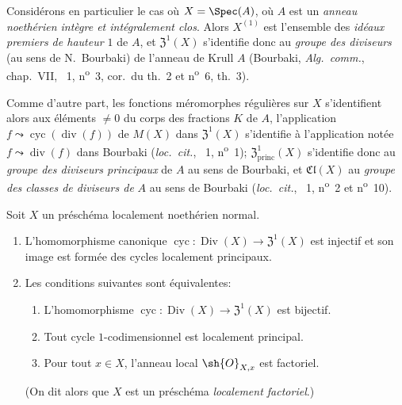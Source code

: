 \begin{env}[21.6.8]
\label{IV.21.6.8}
Considérons en particulier le cas où $X=\Spec(A)$, où $A$ est un \emph{anneau noethérien intègre et intégralement clos}.
Alors $X^{(1)}$ est l'ensemble des \emph{idéaux premiers de hauteur $1$} de $A$, et $\mathfrak{Z}^1(X)$ s'identifie donc au \emph{groupe des diviseurs} (au sens de N.~Bourbaki) de l'anneau de Krull $A$ (Bourbaki, \emph{Alg.\ comm.}, chap.~VII, \textsection~1, n\textsuperscript{o}~3, cor.\ du th.~2 et n\textsuperscript{o}~6, th.~3).

Comme d'autre part, les fonctions méromorphes régulières sur $X$ s'identifient alors aux éléments $\neq0$ du corps des fractions $K$ de $A$, l'application $f\leadsto\operatorname{cyc}(\operatorname{div}(f))$ de $M(X)$ dans $\mathfrak{Z}^1(X)$ s'identifie à l'application notée $f\leadsto\operatorname{div}(f)$ dans Bourbaki (\emph{loc.\ cit.}, \textsection~1, n\textsuperscript{o}~1);
$\mathfrak{Z}^1_\mathrm{princ}(X)$ s'identifie donc au \emph{groupe des diviseurs principaux} de $A$ au sens de Bourbaki, et $\mathfrak{Cl}(X)$ au \emph{groupe des classes de diviseurs de} $A$ au sens de Bourbaki (\emph{loc.\ cit.}, \textsection~1, n\textsuperscript{o}~2 et n\textsuperscript{o}~10).
\end{env}

\begin{theorem}[21.6.9]
Soit $X$ un préschéma localement noethérien \textup{normal}.
\begin{enumerate}[label=\textup{(\roman*)}]
  \item L'homomorphisme canonique $\operatorname{cyc}:\operatorname{Div}(X)\to\mathfrak{Z}^1(X)$ est injectif et son image est formée des cycles localement principaux.
  \item Les conditions suivantes sont équivalentes:
  \begin{enumerate}[label=\emph{\alph*)}]
    \item L'homomorphisme $\operatorname{cyc}:\operatorname{Div}(X)\to\mathfrak{Z}^1(X)$ est bijectif.
    \item Tout cycle $1$-codimensionnel est localement principal.
    \item Pour tout $x\in X$, l'anneau local $\sh{O}_{X,x}$ est factoriel.
  \end{enumerate}
  \textup{(On dit alors que $X$ est un préschéma \emph{localement factoriel}.)}
\end{enumerate}
\end{theorem}

